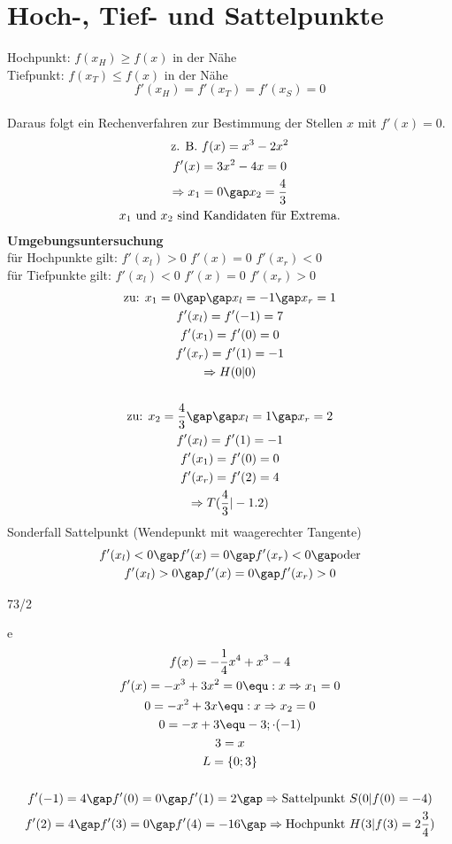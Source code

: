 \section{Hoch-, Tief- und Sattelpunkte}
Hochpunkt: $f(x_H) \geq f(x)$ in der Nähe \\
Tiefpunkt: $f(x_T) \leq f(x)$ in der Nähe \\
$$f'(x_H) = f'(x_T) = f'(x_S) = 0$$ \\
Daraus folgt ein Rechenverfahren zur Bestimmung der Stellen $x$ mit $f'(x) = 0$.
\begin{gather*}
  \text{z. B. } f(x) = x^3 - 2x^2 \\
  f'(x) = 3x^2 - 4x = 0 \\
  \Rightarrow x_1 = 0 \gap x_2 = \frac{4}{3} \\
  x_1 \text{ und } x_2 \text{ sind Kandidaten für Extrema.}
\end{gather*}
\newpage
\textbf{Umgebungsuntersuchung} \\
für Hochpunkte gilt: $f'(x_l) > 0$ $f'(x) = 0$ $f'(x_r) < 0$ \\
für Tiefpunkte gilt: $f'(x_l) < 0$ $f'(x) = 0$ $f'(x_r) > 0$
\begin{gather*}
  \text{zu: } x_1 = 0 \gap\gap x_l = -1 \gap x_r = 1 \\
  f'(x_l) = f'(-1) = 7 \\
  f'(x_1) = f'(0) = 0 \\
  f'(x_r) = f'(1) = -1 \\
  \Rightarrow H(0|0) \\\\
  \text{zu: } x_2 = \frac{4}{3} \gap\gap x_l = 1 \gap x_r = 2 \\
  f'(x_l) = f'(1) = -1 \\
  f'(x_1) = f'(0) = 0 \\
  f'(x_r) = f'(2) = 4 \\
  \Rightarrow T(\frac{4}{3}|-1.2)
\end{gather*}
Sonderfall Sattelpunkt (Wendepunkt mit waagerechter Tangente)
\begin{gather*}
  f'(x_l) < 0 \gap f'(x) = 0 \gap f'(x_r) < 0 \gap \text{oder} \\
  f'(x_l) > 0 \gap f'(x) = 0 \gap f'(x_r) > 0
\end{gather*}
\begin{exercise}{73/2}
  \item [e]
  \begin{gather*}
    f(x) = -\frac{1}{4}x^4 + x^3 - 4 \\
    f'(x) = -x^3 + 3x^2 = 0 \equ :x \Rightarrow x_1 = 0 \\
    0 = -x^2 + 3x \equ :x \Rightarrow x_2 = 0 \\
    0 = -x + 3 \equ -3; \cdot (-1) \\
    3 = x \\
    L = \{0; 3\} \\\\
    f'(-1) = 4 \gap f'(0) = 0 \gap f'(1) = 2 \gap \Rightarrow \text{Sattelpunkt } S(0|f(0) = -4) \\
    f'(2) = 4 \gap f'(3) = 0 \gap f'(4) = -16 \gap \Rightarrow \text{Hochpunkt } H(3|f(3) = 2\frac{3}{4})
  \end{gather*}
\end{exercise}
